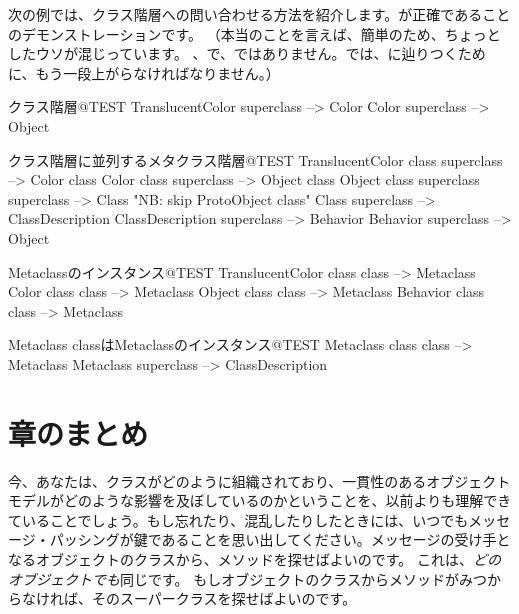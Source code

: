 \documentclass[a4paper,10pt,twoside]{book}
\begin{document}
次の例では、クラス階層への問い合わせる方法を紹介します。が正確であることのデモンストレーションです。
（本当のことを言えば、簡単のため、ちょっとしたウソが混じっています。 、で、ではありません。\pharo では、に辿りつくために、もう一段上がらなければなりません。）

\begin{example}{クラス階層}{@TEST}
TranslucentColor superclass --> Color
Color superclass                   --> Object
\end{example}

\begin{example}{クラス階層に並列するメタクラス階層}{@TEST}
TranslucentColor class superclass   --> Color class
Color class superclass                     --> Object class
Object class superclass superclass --> Class    "NB: skip ProtoObject class"
Class superclass                              --> ClassDescription
ClassDescription superclass            --> Behavior
Behavior superclass                         --> Object
\end{example}

\begin{example}{Metaclassのインスタンス}{@TEST}
TranslucentColor class class --> Metaclass
Color class class                   --> Metaclass
Object class class                 --> Metaclass
Behavior class class              --> Metaclass
\end{example}
\begin{example}{Metaclass classはMetaclassのインスタンス}{@TEST}
Metaclass class class --> Metaclass
Metaclass superclass --> ClassDescription
\end{example}

\section{章のまとめ}
今、あなたは、クラスがどのように組織されており、一貫性のあるオブジェクトモデルがどのような影響を及ぼしているのかということを、以前よりも理解できていることでしょう。もし忘れたり、混乱したりしたときには、いつでもメッセージ・パッシングが鍵であることを思い出してください。メッセージの受け手となるオブジェクトのクラスから、メソッドを探せばよいのです。
これは、\emph{どのオブジェクトでも}同じです。
もしオブジェクトのクラスからメソッドがみつからなければ、そのスーパークラスを探せばよいのです。
\end{document}
